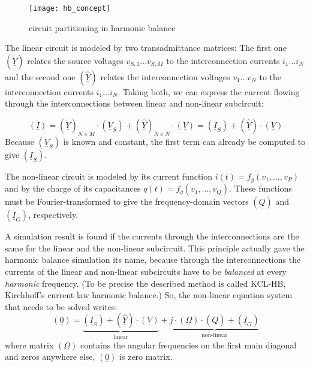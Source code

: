 \begin{figure}[ht]
\begin{center}
\texttt{[image: hb\_concept]}
\end{center}
\caption{circuit partitioning in harmonic balance}
\label{fig:hb_concept}
\end{figure}
\FloatBarrier

The linear circuit is modeled by two transadmittance matrices:
The first one $(\tilde{\underline{Y}})$
relates the source voltages $v_{S,1}...v_{S,M}$ to the interconnection
currents $i_1...i_N$ and the second one $(\hat{\underline{Y}})$
relates the interconnection
voltages $v_1...v_N$ to the interconnection currents $i_1...i_N$.
Taking both, we can express the current flowing through the
interconnections between linear and non-linear subcircuit:

\begin{equation}
\label{eqn:HBlin}
(\underline{I})
  = (\underline{\tilde{Y}})_{N\times M}\cdot (\underline{V}_S) +
    (\underline{\hat{Y}})_{N\times N}\cdot (\underline{V})
  = (\underline{I}_S) + (\underline{\hat{Y}})\cdot (\underline{V})
\end{equation}
Because $(\underline{V}_S)$ is known and constant, the first term
can already be computed to give $(\underline{I}_S)$.

\addvspace{12pt}

The non-linear circuit is modeled by its current function
$i(t) = f_g(v_1, ..., v_P)$
and by the charge of its capacitances
$q(t) = f_q(v_1, ..., v_Q)$.
These functions must be Fourier-transformed to give the
frequency-domain vectors $(\underline{Q})$ and $(\underline{I}_G)$,
respectively.

\addvspace{12pt}

A simulation result is found if the currents through the
interconnections are the same for the linear and the non-linear
subcircuit. This principle actually gave the harmonic balance
simulation its name, because through the interconnections the
currents of the linear and non-linear subcircuits have to be
\textit{balanced} at every \textit{harmonic} frequency. (To
be precise the described method is called KCL-HB, Kirchhoff's
current law harmonic balance.) So, the non-linear equation
system that needs to be solved writes:
\begin{equation}
(\underline{0})
  = \underbrace{(\underline{I}_S) + (\underline{\hat{Y}})\cdot (\underline{V})}_{\text{linear}}
  + \underbrace{j\cdot (\underline{\Omega})\cdot (\underline{Q}) + (\underline{I}_G)}_{\text{non-linear}}
\end{equation}
where matrix $(\underline{\Omega})$ contains the angular frequencies
on the first main diagonal and zeros anywhere else, $(\underline{0})$
is zero matrix.

